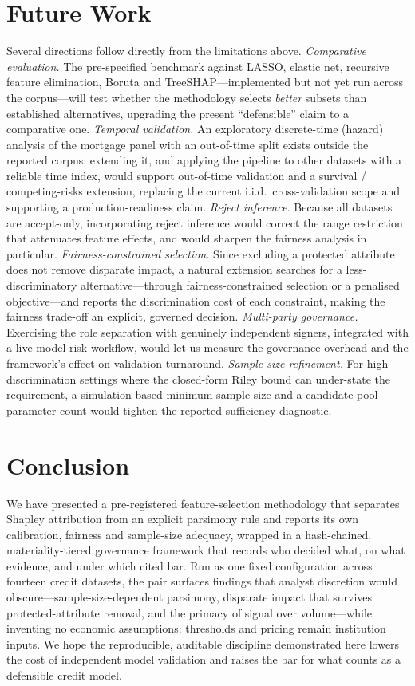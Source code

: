 \documentclass[9pt,journal]{IEEEtai}
\begin{document}
\section{Future Work}\label{sec:future}
Several directions follow directly from the limitations above.
\emph{Comparative evaluation.} The pre-specified benchmark against LASSO, elastic net, recursive
feature elimination, Boruta and TreeSHAP---implemented but not yet run across the corpus---will
test whether the methodology selects \emph{better} subsets than established alternatives,
upgrading the present ``defensible'' claim to a comparative one.
\emph{Temporal validation.} An exploratory discrete-time (hazard) analysis of the mortgage panel
with an out-of-time split exists outside the reported corpus; extending it, and applying the pipeline to
other datasets with a reliable time index, would support out-of-time validation and a survival /
competing-risks extension, replacing the current
i.i.d.\ cross-validation scope and supporting a production-readiness claim.
\emph{Reject inference.} Because all datasets are accept-only, incorporating reject inference would
correct the range restriction that attenuates feature effects, and would sharpen the fairness
analysis in particular.
\emph{Fairness-constrained selection.} Since excluding a protected attribute does not remove
disparate impact, a natural extension searches for a less-discriminatory alternative---through
fairness-constrained selection or a penalised objective---and reports the discrimination cost of
each constraint, making the fairness trade-off an explicit, governed decision.
\emph{Multi-party governance.} Exercising the role separation with genuinely independent signers,
integrated with a live model-risk workflow, would let us measure the governance overhead and the
framework's effect on validation turnaround.
\emph{Sample-size refinement.} For high-discrimination settings where the closed-form Riley bound
can under-state the requirement, a simulation-based minimum sample size and a candidate-pool
parameter count would tighten the reported sufficiency diagnostic.

\section{Conclusion}\label{sec:conclusion}
We have presented a pre-registered feature-selection methodology that separates
Shapley attribution from an explicit parsimony rule and reports its own calibration, fairness and
sample-size adequacy, wrapped in a hash-chained, materiality-tiered governance framework that
records who decided what, on what evidence, and under which cited bar. Run as one fixed
configuration across fourteen credit datasets, the pair surfaces findings that analyst discretion
would obscure---sample-size-dependent parsimony, disparate impact that survives protected-attribute
removal, and the primacy of signal over volume---while inventing no economic assumptions:
thresholds and pricing remain institution inputs. We hope the reproducible, auditable discipline demonstrated
here lowers the cost of independent model validation and raises the bar for what counts as a
defensible credit model.
\end{document}
